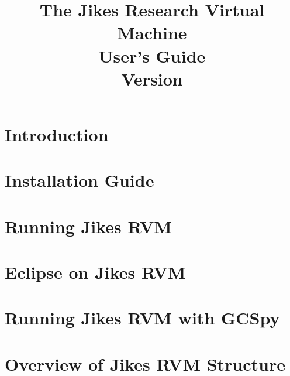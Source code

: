 \documentclass{article}
\title{\texonly{\vfill} {\huge The Jikes\TMboth{} 
Research Virtual Machine \\
User's Guide} 
\\ {\huge Version \version{}}\\ { } \texonly{\vfill} }
\newcommand{\jrvm}{Jikes RVM}
\begin{document}
\maketitle
\date{}

\T \newpage
   \T 
   \T \cleardoublepage

\label{hlxtoc}
\T \tableofcontents
\T \listoffigures
\T \listoftables
\W {}

\T \newpage
\section{Introduction}


\T \newpage
{}
\section{Installation Guide} \label{section:installation}


\T \newpage
\section{Running \jrvm} \label{section:running}


\T \newpage
\section{Eclipse on Jikes RVM} \label{section:eclipse}


\T \newpage
\section{Running Jikes RVM with GCSpy} \label{section:gcspy}


\T \newpage
{}
\section{Overview of \jrvm{} Structure}

\end{document}
